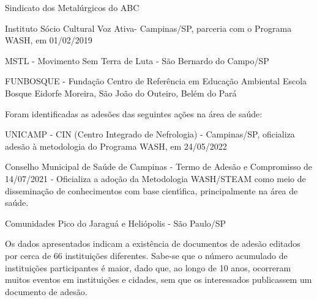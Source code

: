 \documentclass[
12pt,		%
openright,	%
twoside,  %
a4paper,			%
chapter=TITLE,		%
english,			%
french,				%
spanish,			%
brazil				%
]{USPSC-classe/USPSC}
\begin{document}
\begin{alineas}
\item Sindicato dos Metal\'urgicos do ABC
\item Instituto S\'ocio Cultural Voz Ativa- Campinas/SP,  parceria com o Programa WASH, em 01/02/2019
\item MSTL - Movimento Sem Terra de Luta - S\~ao Bernardo do Campo/SP
\item FUNBOSQUE - Funda\c{c}\~ao Centro de Refer\^encia em Educa\c{c}\~ao Ambiental Escola Bosque Eidorfe Moreira, S\~ao Jo\~ao do Outeiro, Bel\'em do Par\'a
\end{alineas}

Foram identificadas as ades\~oes das seguintes a\c{c}\~oes na \'area de sa\'ude:


















\begin{alineas}
\item UNICAMP - CIN (Centro Integrado de Nefrologia) - Campinas/SP, oficializa ades\~ao \`a metodologia do Programa WASH, em 24/05/2022
\item Conselho Municipal de  Sa\'ude de Campinas - Termo de Ades\~ao e Compromisso de 14/07/2021 - Oficializa a ado\c{c}\~ao da Metodologia WASH/STEAM como meio de dissemina\c{c}\~ao de conhecimentos com base cient\'{\i}fica, principalmente na \'area de sa\'ude.
\item Comunidades Pico do Jaragu\'a e Heli\'opolis - S\~ao Paulo/SP
\end{alineas}

Os dados apresentados indicam a exist\^encia de documentos de ades\~ao editados por cerca de 66 institui\c{c}\~oes diferentes. Sabe-se que o n\'umero acumulado de institui\c{c}\~oes participantes \'e maior, dado que, ao longo de 10 anos, ocorreram muitos eventos em institui\c{c}\~oes e cidades, sem que os interessados publicassem um documento de ades\~ao.
\end{document}
